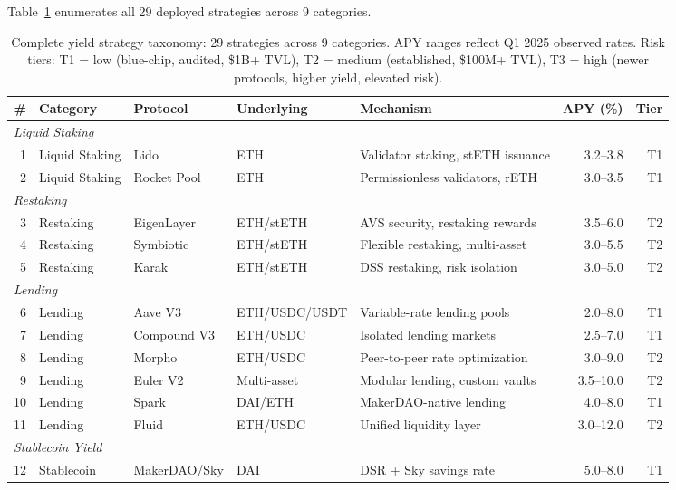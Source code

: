 \documentclass[11pt,twocolumn]{article}
\begin{document}
Table~\ref{tab:full_strategies} enumerates all 29 deployed strategies across 9 categories.

\begin{table}[t]
\centering
\small
\caption{Complete yield strategy taxonomy: 29 strategies across 9 categories. APY ranges reflect Q1 2025 observed rates. Risk tiers: T1 = low (blue-chip, audited, \$1B+ TVL), T2 = medium (established, \$100M+ TVL), T3 = high (newer protocols, higher yield, elevated risk).}
\label{tab:full_strategies}
\begin{tabular}{@{}rllllrr@{}}
\toprule
\textbf{\#} & \textbf{Category} & \textbf{Protocol} & \textbf{Underlying} & \textbf{Mechanism} & \textbf{APY (\%)} & \textbf{Tier} \\
\midrule
\multicolumn{7}{l}{\textit{Liquid Staking}} \\
1 & Liquid Staking & Lido & ETH & Validator staking, stETH issuance & 3.2--3.8 & T1 \\
2 & Liquid Staking & Rocket Pool & ETH & Permissionless validators, rETH & 3.0--3.5 & T1 \\
\midrule
\multicolumn{7}{l}{\textit{Restaking}} \\
3 & Restaking & EigenLayer & ETH/stETH & AVS security, restaking rewards & 3.5--6.0 & T2 \\
4 & Restaking & Symbiotic & ETH/stETH & Flexible restaking, multi-asset & 3.0--5.5 & T2 \\
5 & Restaking & Karak & ETH/stETH & DSS restaking, risk isolation & 3.0--5.0 & T2 \\
\midrule
\multicolumn{7}{l}{\textit{Lending}} \\
6 & Lending & Aave V3 & ETH/USDC/USDT & Variable-rate lending pools & 2.0--8.0 & T1 \\
7 & Lending & Compound V3 & ETH/USDC & Isolated lending markets & 2.5--7.0 & T1 \\
8 & Lending & Morpho & ETH/USDC & Peer-to-peer rate optimization & 3.0--9.0 & T2 \\
9 & Lending & Euler V2 & Multi-asset & Modular lending, custom vaults & 3.5--10.0 & T2 \\
10 & Lending & Spark & DAI/ETH & MakerDAO-native lending & 4.0--8.0 & T1 \\
11 & Lending & Fluid & ETH/USDC & Unified liquidity layer & 3.0--12.0 & T2 \\
\midrule
\multicolumn{7}{l}{\textit{Stablecoin Yield}} \\
12 & Stablecoin & MakerDAO/Sky & DAI & DSR + Sky savings rate & 5.0--8.0 & T1 \\

\end{tabular}
\end{table}
\end{document}
